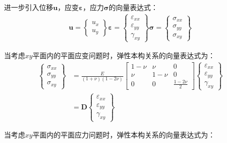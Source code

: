 进一步引入位移$\pmb{u}$，应变$\pmb{\varepsilon}$，应力$\pmb{\sigma}$的向量表达式：
\begin{equation}
\begin{split}
    \pmb{u}=\left\{\begin{matrix} u_x\\u_y\end{matrix}\right\}
    \pmb{\varepsilon}=\left\{\begin{matrix}  
        \varepsilon_{xx}\\\varepsilon_{yy}\\\gamma_{xy}
    \end{matrix}\right\}
    \pmb{\sigma}=\left\{\begin{matrix}
        \sigma_{xx}\\\sigma_{yy}\\\sigma_{xy}
    \end{matrix}\right\}
\end{split}
\end{equation}\par
当考虑$xy$平面内的平面应变问题时，弹性本构关系的向量表达式为：
\begin{equation}
\begin{split}
    \left\{\begin{matrix}
        \sigma_{xx}\\\sigma_{yy}\\\sigma_{xy}
    \end{matrix}\right\}&=\frac{E}{(1+\nu)(1-2\nu)}
    \left[\begin{matrix}
        1-\nu&\nu&0\\\nu&1-\nu&0\\0&0&\frac{1-2\nu}{2}
    \end{matrix}\right]
    \left\{\begin{matrix}
        \varepsilon_{xx}\\\varepsilon_{yy}\\\gamma_{xy}
    \end{matrix}\right\}\\
    &=\pmb{D}\left\{\begin{matrix}\varepsilon_{xx}\\\varepsilon_{yy}\\\gamma_{xy}\end{matrix}\right\}
\end{split}
\end{equation}\par
当考虑$xy$平面内的平面应力问题时，弹性本构关系的向量表达式为：
